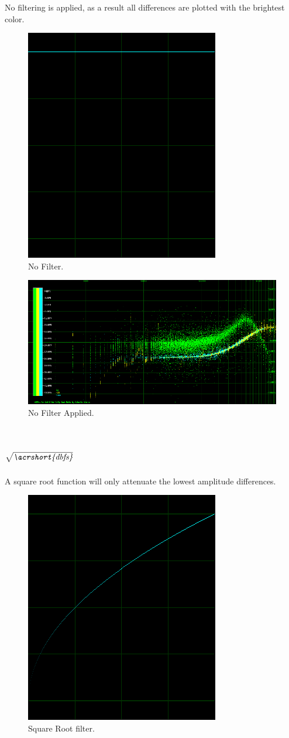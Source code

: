 \documentclass[10pt,a4paper]{report}
\begin{document}
\begin{appendices}
No filtering is applied, as a result all differences are plotted with the brightest color. 

\begin{figure}[H]
	\centering
	\includegraphics[width=0.4\linewidth]{images/colorfilter/BetaFunctionPlot_0.png}
	\caption[No Filter]{No Filter.}
	\label{fig:betafunctionplot0}
\end{figure}

\begin{figure}[H]
	\centering
	\includegraphics[width=1\linewidth]{images/colorfilter/BetaFunctionPlot_0_Data.png}
	\caption[No Filter]{No Filter Applied.}
	\label{fig:betafunctionplot0data}
\end{figure}

\section{$\sqrt{\textit{\acrshort{dbfs}}}$} 

A square root function will only attenuate the lowest amplitude differences.

\begin{figure}[H]
	\centering
	\includegraphics[width=0.4\linewidth]{images/colorfilter/BetaFunctionPlot_1.png}
	\caption[Square Root filter]{Square Root filter.}
	\label{fig:betafunctionplot1}
\end{figure}


\end{appendices}
\end{document}
